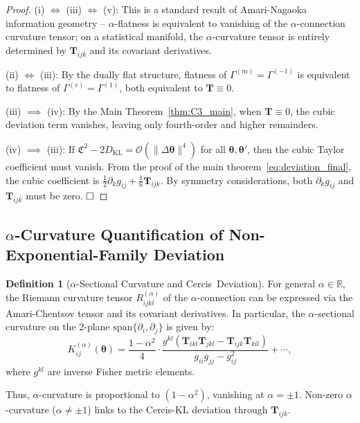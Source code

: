 \documentclass[12pt,a4paper]{article}
\theoremstyle{plain}
\theoremstyle{definition}
\newtheorem{definition}[theorem]{Definition}
\theoremstyle{remark}
\newcommand{\R}{\mathbb{R}}
\newcommand{\Cercis}{\textsf{Cercis}}
\newcommand{\DKL}{D_{\mathrm{KL}}}
\newcommand{\CercisScore}{\mathfrak{C}}
\newcommand{\ACT}{\mathbf{T}}    %
\begin{document}
\begin{proof}
(i) $\iff$ (iii) $\iff$ (v): This is a standard result of Amari-Nagaoka information geometry -- $\alpha$-flatness is equivalent to vanishing of the $\alpha$-connection curvature tensor; on a statistical manifold, the $\alpha$-curvature tensor is entirely determined by $\ACT_{ijk}$ and its covariant derivatives.

(ii) $\iff$ (iii): By the dually flat structure, flatness of $\Gamma^{(m)} = \Gamma^{(-1)}$ is equivalent to flatness of $\Gamma^{(e)} = \Gamma^{(1)}$, both equivalent to $\ACT \equiv 0$.

(iii) $\implies$ (iv): By the Main Theorem~\ref{thm:C3_main}, when $\ACT \equiv 0$, the cubic deviation term vanishes, leaving only fourth-order and higher remainders.

(iv) $\implies$ (iii): If $\CercisScore^2 - 2\DKL = \mathcal{O}(\|\Delta\bm{\theta}\|^4)$ for all $\bm{\theta}, \bm{\theta}'$, then the cubic Taylor coefficient must vanish. From the proof of the main theorem~\eqref{eq:deviation_final}, the cubic coefficient is $\frac{1}{2}\partial_k g_{ij} + \frac{1}{6}\ACT_{ijk}$. By symmetry considerations, both $\partial_k g_{ij}$ and $\ACT_{ijk}$ must be zero. $\hfill\square$
\end{proof}

\subsection{$\alpha$-Curvature Quantification of Non-Exponential-Family Deviation}

\begin{definition}[$\alpha$-Sectional Curvature and \Cercis\ Deviation]
\label{def:alpha_curvature}
For general $\alpha \in \R$, the Riemann curvature tensor $R^{(\alpha)}_{ijkl}$ of the $\alpha$-connection can be expressed via the Amari-Chentsov tensor and its covariant derivatives. In particular, the $\alpha$-sectional curvature on the 2-plane $\mathrm{span}\{\partial_i, \partial_j\}$ is given by:
\begin{equation}\label{eq:alpha_sectional}
    K^{(\alpha)}_{ij}(\bm{\theta}) = \frac{1-\alpha^2}{4} \cdot \frac{g^{kl}(\ACT_{ikl}\ACT_{jkl} - \ACT_{ijk}\ACT_{kll})}{g_{ii}g_{jj} - g_{ij}^2} + \cdots,
\end{equation}
where $g^{kl}$ are inverse Fisher metric elements.

Thus, $\alpha$-curvature is proportional to $(1-\alpha^2)$, vanishing at $\alpha = \pm 1$. Non-zero $\alpha$-curvature ($\alpha \neq \pm 1$) links to the \Cercis-KL deviation through $\ACT_{ijk}$.
\end{definition}
\end{document}
